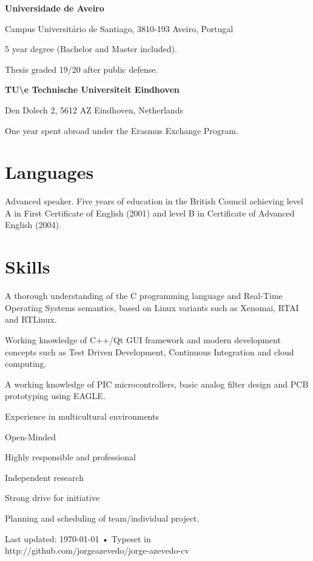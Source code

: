 {
\textbf{Universidade de Aveiro}

Campus Universitário de Santiago, 3810-193 Aveiro, Portugal
}
{
5 year degree (Bachelor and Master included).

Thesis graded 19/20 after public defense. 
}

\vspace{\baselineskip}

{
\textbf{TU\textbackslash e Technische Universiteit Eindhoven}

Den Dolech 2, 5612 AZ Eindhoven, Netherlands
}
{
One year spent abroad under the Erasmus Exchange Program.
}

\section*{Languages}

{
Advanced speaker. Five years of education in the British Council achieving
level A in First Certificate of English (2001) and level B in Certificate of
Advanced English (2004).
}


\section*{Skills}

{

A thorough understanding of the C programming language and Real-Time Operating
Systems semantics, based on Linux variants such as Xenomai, RTAI and RTLinux.

Working knowledge of C++/Qt GUI framework and modern development concepts such
as Test Driven Development, Continuous Integration and cloud computing.

}
{
A working knowledge of PIC microcontrollers, basic analog filter design and PCB prototyping using EAGLE.
}

{
Experience in multicultural environments

Open-Minded

Highly responsible and professional
}
{
Independent research

Strong drive for initiative

Planning and scheduling of team/individual project.
}


\vfill

\begin{center}
{
    \scriptsize  Last updated: \today\- •\- 
    Typeset in \XeLaTeX\\
    http://github.com/jorgeazevedo/jorge-azevedo-cv
}

\end{center}

